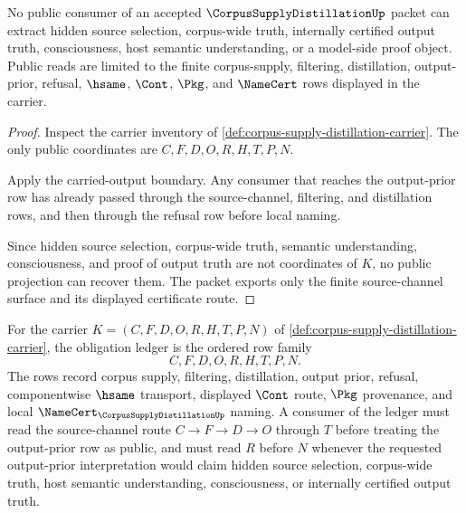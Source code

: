 \begin{theorem}
\label{thm:corpus-supply-distillation-public-nonescape}
No public consumer of an accepted $\CorpusSupplyDistillationUp$ packet can extract hidden source selection, corpus-wide truth, internally certified output truth, consciousness, host semantic understanding, or a model-side proof object. Public reads are limited to the finite corpus-supply, filtering, distillation, output-prior, refusal, $\hsame$, $\Cont$, $\Pkg$, and $\NameCert$ rows displayed in the carrier.
\end{theorem}
\begin{proof}
Inspect the carrier inventory of \autoref{def:corpus-supply-distillation-carrier}. The only public coordinates are $C,F,D,O,R,H,T,P,N$.

Apply the carried-output boundary. Any consumer that reaches the output-prior row has already passed through the source-channel, filtering, and distillation rows, and then through the refusal row before local naming.

Since hidden source selection, corpus-wide truth, semantic understanding, consciousness, and proof of output truth are not coordinates of $K$, no public projection can recover them. The packet exports only the finite source-channel surface and its displayed certificate route.
\end{proof}

\begin{definition}
\label{def:corpus-supply-distillation-obligation-ledger}
For the carrier $K=(C,F,D,O,R,H,T,P,N)$ of \autoref{def:corpus-supply-distillation-carrier}, the obligation ledger is the ordered row family
$$
C,F,D,O,R,H,T,P,N.
$$
The rows record corpus supply, filtering, distillation, output prior, refusal, componentwise $\hsame$ transport, displayed $\Cont$ route, $\Pkg$ provenance, and local $\NameCert_{\CorpusSupplyDistillationUp}$ naming. A consumer of the ledger must read the source-channel route $C \longrightarrow F \longrightarrow D \longrightarrow O$ through $T$ before treating the output-prior row as public, and must read $R$ before $N$ whenever the requested output-prior interpretation would claim hidden source selection, corpus-wide truth, host semantic understanding, consciousness, or internally certified output truth.
\end{definition}

